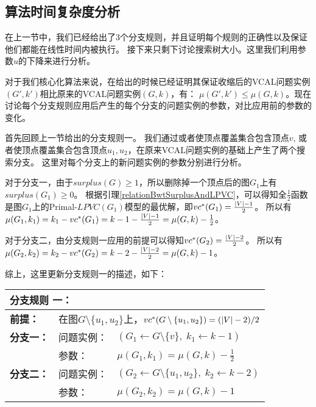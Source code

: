 \subsection{算法时间复杂度分析}
在上一节中，我们已经给出了3个分支规则，并且证明每个规则的正确性以及保证他们都能在线性时间内被执行。
接下来只剩下讨论搜索树大小。这里我们利用参数$u$的下降来进行分析。

对于我们核心化算法来说，在给出的时候已经证明其保证收缩后的VCAL问题实例$(G', k')$相比原来的VCAL问题实例$(G, k)$，有：
$\mu(G', k') \le \mu(G,  k)$。现在讨论每个分支规则应用后产生的每个分支的问题实例的参数，对比应用前的参数的变化。

\vspace{0.5cm}

首先回顾上一节给出的分支规则一。
我们通过或者使顶点覆盖集合包含顶点$v$, 或者使顶点覆盖集合包含顶点$u_1, u_2$，在原来VCAL问题实例的基础上产生了两个搜索分支。
这里对每个分支上的新问题实例的参数分别进行分析。

对于分支一，由于$surplus(G) \ge 1$，所以删除掉一个顶点后的图$G_1$上有$surplus(G_1) \ge 0$。
根据引理\ref{relationBwtSurplusAndLPVC}，可以得知全$\frac{1}{2}$函数是图$G_1$上的Primal-$LPVC(G_1)$模型的最优解，即$vc^*(G_1) = \frac{\left\vert V \right\vert - 1}{2}$。
所以有$\mu(G_1, k_1) = k_1 - vc^*(G_1) = k - 1 - \frac{\left\vert V \right\vert - 1}{2} = \mu(G, k) - \frac{1}{2}$。

对于分支二，由分支规则一应用的前提可以得知$vc^*(G_2) = \frac{\left\vert V \right\vert - 2}{2}$。
所以有$\mu(G_2, k_2) = k_2 - vc^*(G_2) = k - 2 - \frac{\left\vert V \right\vert - 2}{2} = \mu(G, k) - 1$。

综上，这里更新分支规则一的描述，如下：\\

\begin{tabular}{ p{0.12\headwidth} | p{0.12\headwidth}p{0.66\headwidth} }
  \multicolumn{3}{l}{ \textbf{分支规则 一：} }\\
  \hline
  \textbf{前提：}  & \multicolumn{2}{l}{在图$G \setminus \{u_1, u_2\}$上，$vc^*(G \setminus \{u_1, u_2\}) = (\left\vert V \right\vert - 2) / 2$}\\
  \hline
  \textbf{分支一：} & 问题实例：&$(G_1 \leftarrow G \setminus \{v\},\; k_1 \leftarrow k - 1)$ \\
                    & 参数：&$\mu(G_1, k_1) = \mu(G, k) - \frac{1}{2}$\\
  \hline
  \textbf{分支二：} & 问题实例：&$(G_2 \leftarrow G \setminus \{u_1, u_2\},\; k_2 \leftarrow k - 2)$\\
                    & 参数：&$\mu(G_2, k_2) = \mu(G, k) - 1$\\
  \hline
\end{tabular} \vspace{0.5cm}

